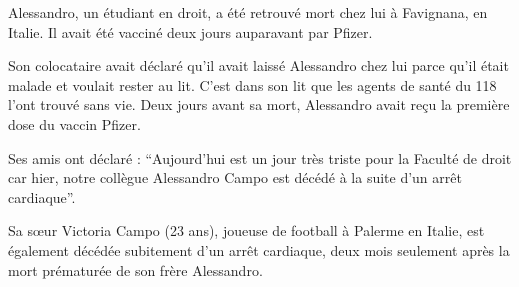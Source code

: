 Alessandro, un étudiant en droit, a été retrouvé mort chez lui à Favignana, en
Italie. Il avait été vacciné deux jours auparavant par Pfizer.

Son colocataire avait déclaré qu'il avait laissé Alessandro chez lui parce qu'il
était malade et voulait rester au lit. C'est dans son lit que les agents de
santé du 118 l'ont trouvé sans vie. Deux jours avant sa mort, Alessandro avait
reçu la première dose du vaccin Pfizer.

Ses amis ont déclaré : ``Aujourd'hui est un jour très triste pour la Faculté de
droit car hier, notre collègue Alessandro Campo est décédé à la suite d'un arrêt
cardiaque''.

Sa sœur Victoria Campo (23 ans), joueuse de football à Palerme en Italie, est
également décédée subitement d'un arrêt cardiaque, deux mois seulement après la
mort prématurée de son frère Alessandro.
